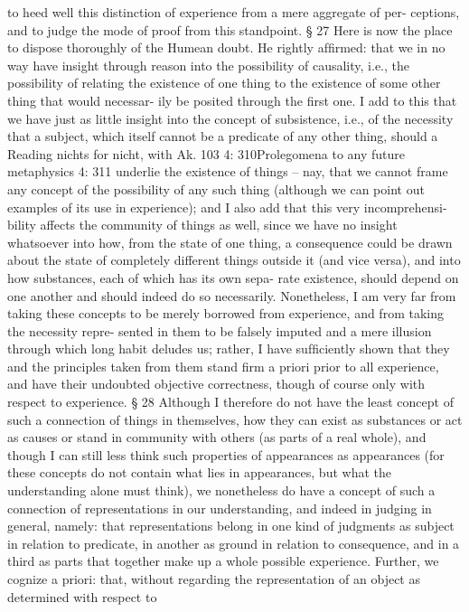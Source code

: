 to heed well this distinction of experience from a mere aggregate of per-
ceptions, and to judge the mode of proof from this standpoint.
§ 27
Here is now the place to dispose thoroughly of the Humean doubt. He
rightly afﬁrmed: that we in no way have insight through reason into
the possibility of causality, i.e., the possibility of relating the existence
of one thing to the existence of some other thing that would necessar-
ily be posited through the ﬁrst one. I add to this that we have just as
little insight into the concept of subsistence, i.e., of the necessity that
a subject, which itself cannot be a predicate of any other thing, should
a
Reading nichts for nicht, with Ak.
103
4: 310Prolegomena to any future metaphysics
4: 311
underlie the existence of things – nay, that we cannot frame any concept
of the possibility of any such thing (although we can point out examples
of its use in experience); and I also add that this very incomprehensi-
bility affects the community of things as well, since we have no insight
whatsoever into how, from the state of one thing, a consequence could
be drawn about the state of completely different things outside it (and
vice versa), and into how substances, each of which has its own sepa-
rate existence, should depend on one another and should indeed do so
necessarily. Nonetheless, I am very far from taking these concepts to be
merely borrowed from experience, and from taking the necessity repre-
sented in them to be falsely imputed and a mere illusion through which
long habit deludes us; rather, I have sufﬁciently shown that they and the
principles taken from them stand ﬁrm a priori prior to all experience,
and have their undoubted objective correctness, though of course only
with respect to experience.
§ 28
Although I therefore do not have the least concept of such a connection
of things in themselves, how they can exist as substances or act as causes
or stand in community with others (as parts of a real whole), and though
I can still less think such properties of appearances as appearances (for
these concepts do not contain what lies in appearances, but what the
understanding alone must think), we nonetheless do have a concept of
such a connection of representations in our understanding, and indeed
in judging in general, namely: that representations belong in one kind
of judgments as subject in relation to predicate, in another as ground in
relation to consequence, and in a third as parts that together make up
a whole possible experience. Further, we cognize a priori: that, without
regarding the representation of an object as determined with respect to
